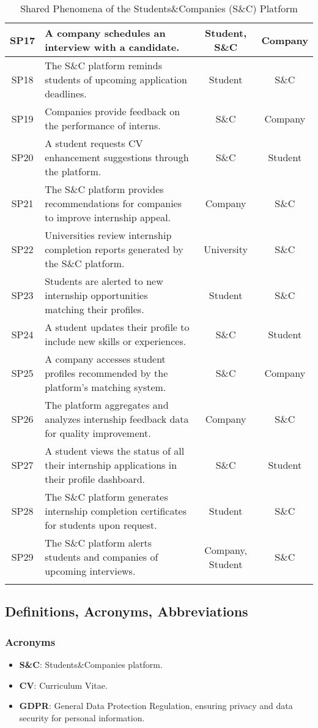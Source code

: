 \begin{longtable}{|c|p{5cm}|c|c|}
SP17 & A company schedules an interview with a candidate. & Student, S\&C & Company \\ \hline
SP18 & The S\&C platform reminds students of upcoming application deadlines. & Student & S\&C \\ \hline
SP19 & Companies provide feedback on the performance of interns. & S\&C & Company \\ \hline
SP20 & A student requests CV enhancement suggestions through the platform. & S\&C & Student \\ \hline
SP21 & The S\&C platform provides recommendations for companies to improve internship appeal. & Company & S\&C \\ \hline
SP22 & Universities review internship completion reports generated by the S\&C platform. & University & S\&C \\ \hline
SP23 & Students are alerted to new internship opportunities matching their profiles. & Student & S\&C \\ \hline
SP24 & A student updates their profile to include new skills or experiences. & S\&C & Student \\ \hline
SP25 & A company accesses student profiles recommended by the platform’s matching system. & S\&C & Company \\ \hline
SP26 & The platform aggregates and analyzes internship feedback data for quality improvement. & Company & S\&C \\ \hline
SP27 & A student views the status of all their internship applications in their profile dashboard. & S\&C & Student \\ \hline
SP28 & The S\&C platform generates internship completion certificates for students upon request. & Student & S\&C \\ \hline
SP29 & The S\&C platform alerts students and companies of upcoming interviews. & Company, Student & S\&C \\ \hline
\caption{Shared Phenomena of the Students\&Companies (S\&C) Platform}
\end{longtable}

\newpage

\subsection{Definitions, Acronyms, Abbreviations}
\subsubsection{Acronyms}
\begin{itemize}
    \item \textbf{S\&C}: Students\&Companies platform.
    \item \textbf{CV}: Curriculum Vitae.
    \item \textbf{GDPR}: General Data Protection Regulation, ensuring privacy and data security for personal information.
\end{itemize}
